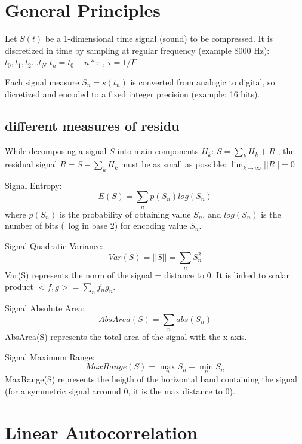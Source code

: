 \documentclass[english]{article}
\begin{document}
\section{General Principles}

Let $S(t)$ be a 1-dimensional time signal (sound) to be compressed.
It is discretized in time by sampling at regular frequency (example 8000 Hz): $t_0, t_1, t_2 \ldots t_N$
$t_n = t_0 + n * \tau$ ,   $\tau=1/F$ 

Each signal measure $S_n=s(t_{n})$ is converted from analogic to digital, so dicretized and encoded to a fixed
integer precision (example: 16 bits).


\subsection{different measures of residu}


\noindent While decomposing a signal $S$ into main components $H_k$: $S=\sum_k H_k + R$ , the residual signal $R = S -
\sum_k H_k$ must be as small as possible: $ \lim_{k \rightarrow \infty} ||R|| = 0 $

\noindent Signal Entropy:
\begin{equation}
E(S) = \sum_n p(S_n) log(S_n)
\end{equation}
where $p(S_n)$ is the probability of obtaining value $S_n$, and $log(S_n)$ is the number of bits (~log in base 2) for
encoding value $S_n$.


\noindent Signal Quadratic Variance:
\begin{equation}
Var(S) = ||S|| = \sum_n S_n^2
\end{equation}
Var(S) represents the norm of the signal = distance to 0. It is linked to scalar product $<f,g> = \sum_n f_n g_n$.


\noindent Signal Absolute Area:
\begin{equation}
AbsArea(S) = \sum_n abs(S_n)
\end{equation}
AbsArea(S) represents the total area of the signal with the x-axis. 

\noindent Signal Maximum Range:
\begin{equation}
MaxRange(S) = \max_n S_n - \min_n S_n
\end{equation}
MaxRange(S) represents the heigth of the horizontal band containing the signal (for a symmetric signal arround 0, it
is the max distance to 0).


\section{Linear Autocorrelation}
\end{document}
